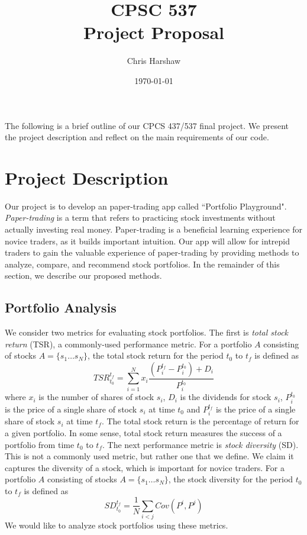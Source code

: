 \documentclass{article}
\begin{document}
\title{CPSC 537  \\ Project Proposal}
\author{Chris Harshaw}
\date{\today}
\maketitle

\pagestyle{fancy}
\fancyhf{}
\rfoot{\thepage}

The following is a brief outline of our CPCS 437/537 final project. We present the project description and reflect on the main requirements of our code.

\section{Project Description}
Our project is to develop an paper-trading app called ``Portfolio Playground". \emph{Paper-trading} is a term that refers to practicing stock investments without actually investing real money. Paper-trading is a beneficial learning experience for novice traders, as it builds important intuition. Our app will allow for intrepid traders to gain the valuable experience of paper-trading by providing methods to analyze, compare, and recommend stock portfolios. In the remainder of this section, we describe our proposed methods.

\subsection{Portfolio Analysis}
We consider two metrics for evaluating stock portfolios. The first is \emph{total stock return} (TSR), a commonly-used performance metric. For a portfolio $A$ consisting of stocks $A = \{s_1\dots s_N\}$, the total stock return for the period $t_0$ to $t_f$ is defined as
$$ TSR_{t_0}^{t_f} = \sum_{i=1}^N x_i \frac{(P^{t_f}_{i} - P^{t_0}_{i}) + D_i}{P^{t_0}_{i}} $$
where $x_i$ is the number of shares of stock $s_i$, $D_i$ is the dividends for stock $s_i$, $P^{t_0}_{i}$ is the price of a single share of stock $s_i$ at time $t_0$ and $P^{t_f}_{i}$ is the price of a single share of stock $s_i$ at time $t_f$. The total stock return is the percentage of return for a given portfolio. In some sense, total stock return measures the success of a portfolio from time $t_0$ to $t_f$. The next performance metric is \emph{stock diversity} (SD). This is not a commonly used metric, but rather one that we define. We claim it captures the diversity of a stock, which is important for novice traders. For a portfolio $A$ consisting of stocks $A = \{s_1\dots s_N\}$, the stock diversity for the period $t_0$ to $t_f$ is defined as 
$$ SD_{t_0}^{t_f} = \frac{1}{N}\sum_{i<j} Cov(P^i, P^j) $$
We would like to analyze stock portfolios using these metrics.
\end{document}
